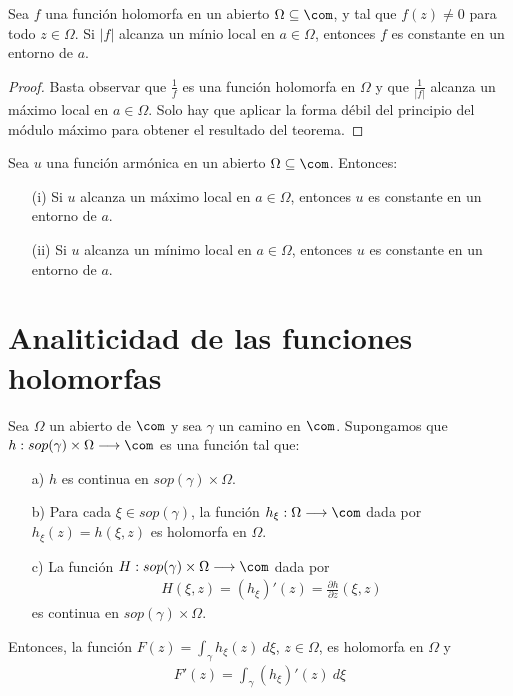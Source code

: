 \begin{teo}
Sea $f$ una función holomorfa en un abierto $\Omega \subseteq \com$, y tal que $f(z) \not = 0$ para todo $z \in \Omega$. Si $|f|$ alcanza un mínio local en $a \in \Omega$, entonces $f$ es constante en un entorno de $a$.
\end{teo}

\begin{proof}
Basta observar que $\frac{1}{f}$ es una función holomorfa en $\Omega$ y que $\frac{1}{|f|}$ alcanza un máximo local en $a \in \Omega$. Solo hay que aplicar la forma débil del principio del módulo máximo para obtener el resultado del teorema.
\end{proof}

\begin{teo}
Sea $u$ una función armónica en un abierto $\Omega \subseteq \com$. Entonces:
\begin{enumerate}
    \item[(i)] Si $u$ alcanza un máximo local en $a \in \Omega$, entonces $u$ es constante en un entorno de $a$.
    \item[(ii)] Si $u$ alcanza un mínimo local en $a \in \Omega$, entonces $u$ es constante en un entorno de $a$.
\end{enumerate}
\end{teo}

\newpage

\section{Analiticidad de las funciones holomorfas}

\begin{teo}
Sea $\Omega$ un abierto de $\com$ y sea $\gamma$ un camino en $\com$. Supongamos que $h: sop(\gamma) \times \Omega \longrightarrow \com$ es una función tal que:
\begin{enumerate}
    \item[a)] $h$ es continua en $sop(\gamma) \times \Omega$.
    \item[b)] Para cada $\xi \in sop(\gamma)$, la función $h_{\xi}: \Omega \longrightarrow \com$ dada por $h_{\xi}(z) = h(\xi,z)$ es holomorfa en $\Omega$.
    \item[c)] La función $H : sop(\gamma) \times \Omega \longrightarrow \com$ dada por
    \begin{align*}
        H(\xi,z) = (h_{\xi})'(z) = \frac{\partial h}{\partial z}(\xi,z)
    \end{align*}
    es continua en $sop(\gamma) \times \Omega$.
\end{enumerate}
Entonces, la función $F(z) = \int_{\gamma}{h_{\xi}(z) \ d\xi}$, $z \in \Omega$, es holomorfa en $\Omega$ y
\begin{align*}
    F'(z) = \int_{\gamma}{(h_{\xi})'(z) \ d\xi}
\end{align*}
\end{teo}

